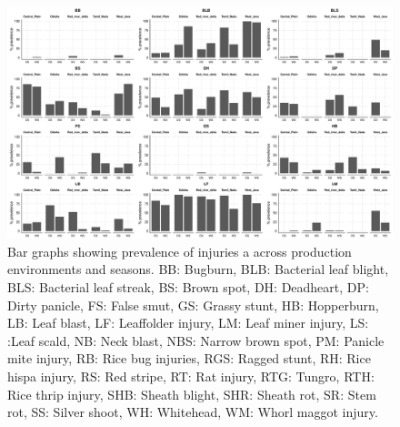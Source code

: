     \begin{landscape}
\begin{figure}
\centering
\includegraphics[height = 1\textwidth]{figures/barplot1.pdf}
\caption[Bar graphs showing  prevalence of injuries a across production environments and seasons.]{Bar graphs showing  prevalence of injuries a across production environments and seasons. BB: Bugburn, BLB: Bacterial leaf blight, BLS: Bacterial leaf streak, BS: Brown spot, DH: Deadheart, DP: Dirty panicle, FS: False smut, GS: Grassy stunt, HB: Hopperburn, LB: Leaf blast, LF: Leaffolder injury, LM: Leaf miner injury, LS: :Leaf scald, NB: Neck blast, NBS:  Narrow brown spot, PM: Panicle mite injury, RB: Rice bug injuries, RGS: Ragged stunt, RH: Rice hispa injury, RS: Red stripe, RT: Rat injury, RTG: Tungro, RTH: Rice thrip injury, SHB: Sheath blight, SHR: Sheath rot, SR: Stem rot, SS: Silver shoot, WH: Whitehead, WM: Whorl maggot injury.}
\label{fig:barplot1}
\end{figure}    
\end{landscape} 
    

